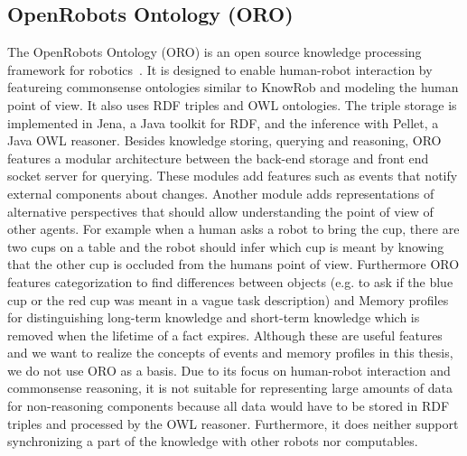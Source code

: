 \documentclass[a4paper,11pt]{article}
\begin{document}
\subsection{OpenRobots Ontology (ORO)}
\label{sec:oro}
The OpenRobots Ontology (ORO) is an open source knowledge processing
framework for robotics~\cite{Oro}. It is designed to enable human-robot
interaction by featureing commonsense ontologies similar to KnowRob and
modeling the human point of view. It also uses RDF triples and OWL ontologies.
The triple storage is implemented in Jena, a Java toolkit for RDF, and the
inference with Pellet, a Java OWL reasoner. Besides knowledge storing,
querying and reasoning, ORO features a modular architecture between
the back-end storage and front end socket server for querying. These
modules add features such as events that notify external components
about changes.
Another module adds representations of alternative perspectives that
should allow understanding the point of view of other agents.
For example when a human asks a robot to bring the
cup, there are two cups on a table and the robot should infer which
cup is meant by knowing that the other cup is occluded from the humans
point of view. Furthermore ORO features categorization to find
differences between objects (e.g. to ask if the blue cup or the red
cup was meant in a vague task description) and Memory profiles for
distinguishing long-term knowledge and short-term knowledge which is
removed when the lifetime of a fact expires. Although these are useful
features and we want to realize the concepts of events and memory
profiles in this thesis, we do not use ORO as a basis. Due to its
focus on human-robot interaction and commonsense reasoning, it is not
suitable for representing large amounts of data for non-reasoning
components because all data would have to be stored in RDF triples and
processed by the OWL reasoner. Furthermore, it does neither support
synchronizing a part of the knowledge with other robots nor computables.
\end{document}
